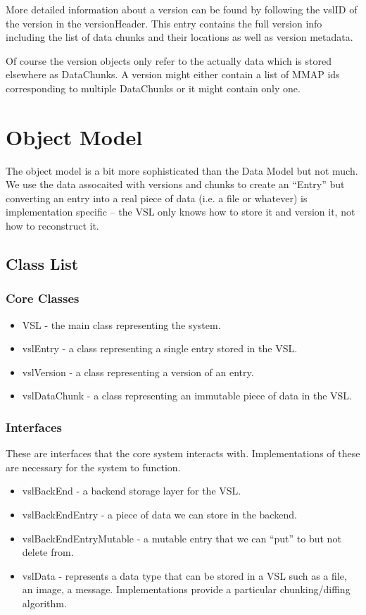 \documentclass[10pt]{article}
\begin{document}
More detailed information about a version can be found by following the vslID of
the version in the versionHeader.  This entry contains the full version info
including the list of data chunks and their locations as well as version
metadata.

Of course the version objects only refer to the actually data which is stored
elsewhere as DataChunks. A version might either contain a list of MMAP ids
corresponding to multiple DataChunks or it might contain only one.


\section{Object Model}

The object model is a bit more sophisticated than the Data Model but not much.  We use the data assocaited with versions and chunks to create an ``Entry'' but converting an entry into a real piece of data (i.e. a file or whatever) is implementation specific -- the VSL only knows how to store it and version it, not how to reconstruct it.

\subsection{Class List}

\subsubsection{Core Classes}

\begin{itemize}
	\item VSL - the main class representing the system.
	\item vslEntry - a class representing a single entry stored in the VSL.
	\item vslVersion - a class representing a version of an entry.
	\item vslDataChunk - a class representing an immutable piece of data in the
		VSL.
\end{itemize}

\subsubsection{Interfaces}

These are interfaces that the core system interacts with.  Implementations of
these are necessary for the system to function.

\begin{itemize}
	\item vslBackEnd - a backend storage layer for the VSL.
	\item vslBackEndEntry - a piece of data we can store in the backend.  
	\item vslBackEndEntryMutable - a mutable entry that we can ``put'' to but
		not delete from.
	\item vslData - represents a data type that can be stored in a VSL such as a
		file, an image, a message.  Implementations provide a particular
		chunking/diffing algorithm.
\end{itemize}
\end{document}
